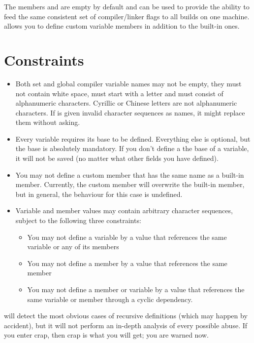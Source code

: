 The members  and  are empty by default and can be used to provide the ability to feed the same consistent set of compiler/linker flags to all builds on one machine. \codeblocks allows you to define custom variable members in addition to the built-in ones.

\section{Constraints}

\begin{itemize}
\item Both set and global compiler variable names may not be empty, they must not contain white space, must start with a letter and must consist of alphanumeric characters. Cyrillic or Chinese letters are not alphanumeric characters. If \codeblocks is given invalid character sequences as names, it might replace them without asking.
\item Every variable requires its base to be defined. Everything else is optional, but the base is absolutely mandatory. If you don't define a the base of a variable, it will not be saved (no matter what other fields you have defined).
\item You may not define a custom member that has the same name as a built-in member. Currently, the custom member will overwrite the built-in member, but in general, the behaviour for this case is undefined.
\item Variable and member values may contain arbitrary character sequences, subject to the following three constraints:
\begin{itemize}
\item You may not define a variable by a value that references the same variable or any of its members
\item You may not define a member by a value that references the same member
\item You may not define a member or variable by a value that references the same variable or member through a cyclic dependency.
\end{itemize}
\end{itemize}

\codeblocks will detect the most obvious cases of recursive definitions (which may happen by accident), but it will not perform an in-depth analysis of every possible abuse. If you enter crap, then crap is what you will get; you are warned now.

